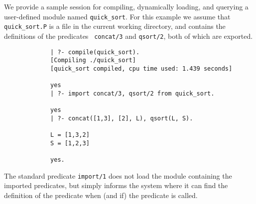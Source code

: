 

We provide a sample session for compiling, dynamically loading, and
querying a user-defined module named {\tt quick\_sort}.  For this
example we assume that {\tt quick\_sort.P} is a file in the current
working directory, and contains the definitions of the predicates {\tt
concat/3} and {\tt qsort/2}, both of which are exported.

{\footnotesize
\begin{verbatim}
             | ?- compile(quick_sort).
             [Compiling ./quick_sort]
             [quick_sort compiled, cpu time used: 1.439 seconds]

             yes
             | ?- import concat/3, qsort/2 from quick_sort. 

             yes
             | ?- concat([1,3], [2], L), qsort(L, S).

             L = [1,3,2]
             S = [1,2,3]

             yes.
\end{verbatim}
}

The standard predicate {\tt import/1} does not load the module 
containing the imported predicates, but simply informs the system 
where it can find the definition of the predicate when (and if) the
predicate is called.


